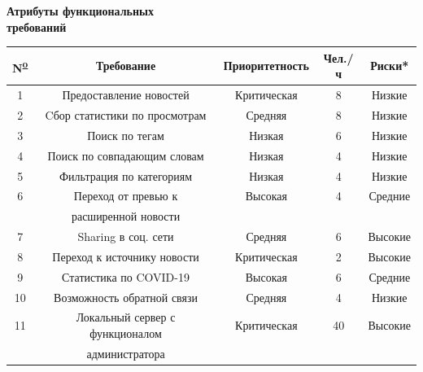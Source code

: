 \begin{center}
    \large
    \textbf{Атрибуты функциональных \\ требований\\}
    \small
    \begin{tabular}{|c|c|c|c|c|}
        \hline
        N\textsuperscript{\underline{o}} & Требование                                & Приоритетность & Чел./ч & Риски*  \\
        \hline
        1                                & Предоставление новостей                   & Критическая    & 8      & Низкие  \\
        \hline
        2                                & Cбор статистики по просмотрам             & Средняя        & 8      & Низкие  \\
        \hline
        3                                & Поиск по тегам                            & Низкая         & 6      & Низкие  \\
        \hline
        4                                & Поиск по совпадающим словам               & Низкая         & 4      & Низкие  \\
        \hline
        5                                & Фильтрация по категориям                  & Низкая         & 4      & Низкие  \\
        \hline
        6                                & Переход от превью к                       & Высокая        & 4      & Средние \\
        & расширенной новости                       &                &        &         \\
        \hline
        7                                & Sharing в соц. сети                       & Средняя        & 6      & Высокие \\
        \hline
        8                                & Переход к источнику новости               & Критическая    & 2      & Высокие \\
        \hline
        9                                & Статистика по COVID-19                    & Высокая        & 6      & Средние \\
        \hline
        10                               & Возможность обратной связи                & Средняя        & 4      & Низкие  \\
        \hline
        11                               & Локальный сервер с функционалом           & Критическая    & 40     & Высокие \\
        & администратора                            &                &        &         \\

\end{tabular}
\end{center}
